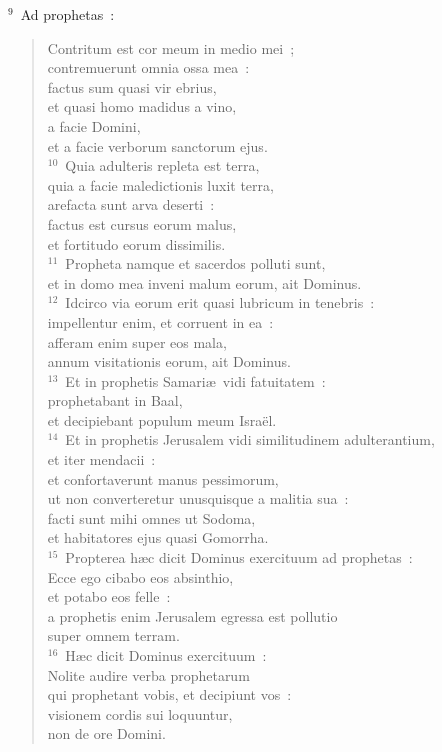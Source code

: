 ${}^{9}$~Ad prophetas~: \begin{verse}Contritum est cor meum in medio mei~;\\ contremuerunt omnia ossa mea~:\\ factus sum quasi vir ebrius,\\ et quasi homo madidus a vino,\\ a facie Domini,\\ et a facie verborum sanctorum ejus.\\
${}^{10}$~Quia adulteris repleta est terra,\\ quia a facie maledictionis luxit terra,\\ arefacta sunt arva deserti~:\\ factus est cursus eorum malus,\\ et fortitudo eorum dissimilis.\\
${}^{11}$~Propheta namque et sacerdos polluti sunt,\\ et in domo mea inveni malum eorum, ait Dominus.\\
${}^{12}$~Idcirco via eorum erit quasi lubricum in tenebris~:\\ impellentur enim, et corruent in ea~:\\ afferam enim super eos mala,\\ annum visitationis eorum, ait Dominus.\\
${}^{13}$~Et in prophetis Samari\ae\ vidi fatuitatem~:\\ prophetabant in Baal,\\ et decipiebant populum meum Isra\"el.\\
${}^{14}$~Et in prophetis Jerusalem vidi similitudinem adulterantium,\\ et iter mendacii~:\\ et confortaverunt manus pessimorum,\\ ut non converteretur unusquisque a malitia sua~:\\ facti sunt mihi omnes ut Sodoma,\\ et habitatores ejus quasi Gomorrha.\\
${}^{15}$~Propterea h\ae c dicit Dominus exercituum ad prophetas~:\\ Ecce ego cibabo eos absinthio,\\ et potabo eos felle~:\\ a prophetis enim Jerusalem egressa est pollutio\\ super omnem terram.\\
${}^{16}$~H\ae c dicit Dominus exercituum~:\\ Nolite audire verba prophetarum\\ qui prophetant vobis, et decipiunt vos~:\\ visionem cordis sui loquuntur,\\ non de ore Domini.\\

\end{verse}
